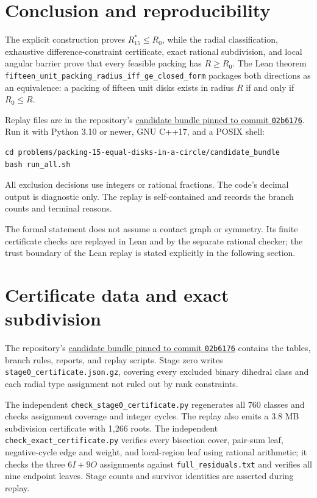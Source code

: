 \documentclass[11pt]{article}
\theoremstyle{definition}
\begin{document}
\section{Conclusion and reproducibility}\label{sec:conclusion}

The explicit construction proves $R_{15}^*\le R_0$, while the radial classification, exhaustive difference-constraint certificate, exact rational subdivision, and local angular barrier prove that every feasible packing has $R\ge R_0$. The Lean theorem \texttt{fifteen\_unit\_packing\_radius\_iff\_ge\_closed\_form} packages both directions as an equivalence: a packing of fifteen unit disks exists in radius $R$ if and only if $R_0\le R$.

Replay files are in the repository's \href{https://github.com/ziifave/unequal-circle-proof/tree/02b61760e4dd392fbe3dd19499312d5d8c1135a4/problems/packing-15-equal-disks-in-a-circle/candidate_bundle}{candidate bundle pinned to commit \texttt{02b6176}}. Run it with Python 3.10 or newer, GNU C++17, and a POSIX shell:
\begin{verbatim}
cd problems/packing-15-equal-disks-in-a-circle/candidate_bundle
bash run_all.sh
\end{verbatim}
All exclusion decisions use integers or rational fractions. The code's decimal output is diagnostic only. The replay is self-contained and records the branch counts and terminal reasons.

The formal statement does not assume a contact graph or symmetry. Its finite certificate checks are replayed in Lean and by the separate rational checker; the trust boundary of the Lean replay is stated explicitly in the following section.

\appendix
\section{Certificate data and exact subdivision}

The repository's \href{https://github.com/ziifave/unequal-circle-proof/tree/02b61760e4dd392fbe3dd19499312d5d8c1135a4/problems/packing-15-equal-disks-in-a-circle/candidate_bundle}{candidate bundle pinned to commit \texttt{02b6176}} contains the tables, branch rules, reports, and replay scripts. Stage zero writes \texttt{stage0\_certificate.json.gz}, covering every excluded binary dihedral class and each radial type assignment not ruled out by rank constraints.

The independent \texttt{check\_stage0\_certificate.py} regenerates all 760 classes and checks assignment coverage and integer cycles. The replay also emits a 3.8 MB subdivision certificate with 1,266 roots. The independent \texttt{check\_exact\_certificate.py} verifies every bisection cover, pair-sum leaf, negative-cycle edge and weight, and local-region leaf using rational arithmetic; it checks the three $6I+9O$ assignments against \texttt{full\_residuals.txt} and verifies all nine endpoint leaves. Stage counts and survivor identities are asserted during replay.
\end{document}
